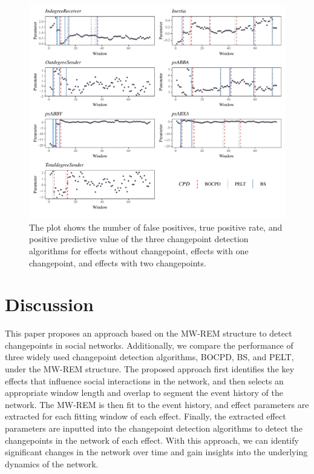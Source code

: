 \documentclass[]{interact}
\theoremstyle{plain}%
\theoremstyle{definition}
\theoremstyle{remark}
\begin{document}
{    \begin{figure}[h]
    	\captionsetup{justification=raggedright}
    	\renewcommand{\figurename}{Figure}
    	\centering
    	\includegraphics[width=\textwidth,height=\textheight,keepaspectratio]{Apollo_CPD_bw}
    	\caption{\fontsize{8}{10}\selectfont The plot shows the number of false positives, true positive rate, and positive predictive value of the three changepoint detection algorithms for effects without changepoint, effects with one changepoint, and effects with two changepoints.}
    	\label{Figure 6}
    \end{figure}
	
	\section{\fontsize{14}{15}\selectfont Discussion}
	
	\hspace{0.28cm} This paper proposes an approach based on the MW-REM structure to detect changepoints in social networks. Additionally, we compare the performance of three widely used changepoint detection algorithms, BOCPD, BS, and PELT, under the MW-REM structure. The proposed approach first identifies the key effects that influence social interactions in the network, and then selects an appropriate window length and overlap to segment the event history of the network. The MW-REM is then fit to the event history, and effect parameters are extracted for each fitting window of each effect. Finally, the extracted effect parameters are inputted into the changepoint detection algorithms to detect the changepoints in the network of each effect. With this approach, we can identify significant changes in the network over time and gain insights into the underlying dynamics of the network. \\
	
}
\end{document}
